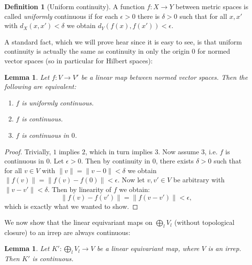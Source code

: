\documentclass[12pt, a4paper]{article}
\theoremstyle{plain}
\newtheorem{lem}[pro]{Lemma}
\theoremstyle{definition}
\newtheorem{dfn}[pro]{Definition}
\theoremstyle{remark}
\begin{document}
\begin{dfn}[Uniform continuity]
A function $f: X \to Y$ between metric spaces is called \emph{uniformly} continuous if for each $\epsilon > 0$ there is $\delta > 0$ such that for all $x, x'$ with $d_X(x, x') < \delta$ we obtain $d_Y(f(x), f(x')) < \epsilon$.
\end{dfn}

A standard fact, which we will prove hear since it is easy to see, is that uniform continuity is actually the same as continuity in only the origin $0$ for normed vector spaces (so in particular for Hilbert spaces):

\begin{lem}\label{characterization_continuity}
Let $f: V \to V'$ be a linear map between normed vector spaces. Then the following are equivalent:
\begin{enumerate}
\item $f$ is uniformly continuous.
\item $f$ is continuous.
\item $f$ is continuous in $0$.
\end{enumerate}
\end{lem}

\begin{proof}
Trivially, $1$ implies $2$, which in turn implies $3$. Now assume $3$, i.e. $f$ is continuous in $0$. Let $\epsilon > 0$. Then by continuity in $0$, there exists $\delta > 0$ such that for all $v \in V$ with $\|v\| = \|v - 0\|<\delta$ we obtain $\|f(v)\| = \|f(v) - f(0)\| < \epsilon$. Now let $v, v' \in V$ be arbitrary with $\|v - v'\| < \delta$. Then by linearity of $f$ we obtain:
\begin{equation*}
\|f(v) - f(v')\| = \|f(v - v')\| < \epsilon,
\end{equation*}
which is exactly what we wanted to show.
\end{proof}

We now show that the linear equivariant maps on $\bigoplus_{l} V_l$ (without topological closure) to an irrep are always continuous:

\begin{lem}\label{always_continuous}
Let $K': \bigoplus_{l} V_l \to V$ be a linear equivariant map, where $V$ is an irrep. Then $K'$ is continuous.
\end{lem}
\end{document}
